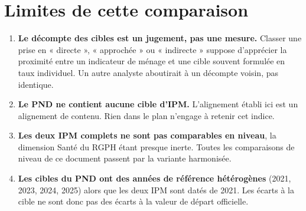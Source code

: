 \documentclass[11pt,a4paper]{article}
\begin{document}
\section{Limites de cette comparaison}

\begin{enumerate}
  \item \textbf{Le décompte des cibles est un jugement, pas une mesure.} Classer une prise en
        « directe », « approchée » ou « indirecte » suppose d'apprécier la proximité entre un
        indicateur de ménage et une cible souvent formulée en taux individuel. Un autre analyste
        aboutirait à un décompte voisin, pas identique.
  \item \textbf{Le PND ne contient aucune cible d'IPM.} L'alignement établi ici est un alignement de
        contenu. Rien dans le plan n'engage à retenir cet indice.
  \item \textbf{Les deux IPM complets ne sont pas comparables en niveau}, la dimension Santé du
        RGPH étant presque inerte. Toutes les comparaisons de niveau de ce document passent par la
        variante harmonisée.
  \item \textbf{Les cibles du PND ont des années de référence hétérogènes} (2021, 2023, 2024, 2025)
        alors que les deux IPM sont datés de 2021. Les écarts à la cible ne sont donc pas des
        écarts à la valeur de départ officielle.
\end{enumerate}
\end{document}
